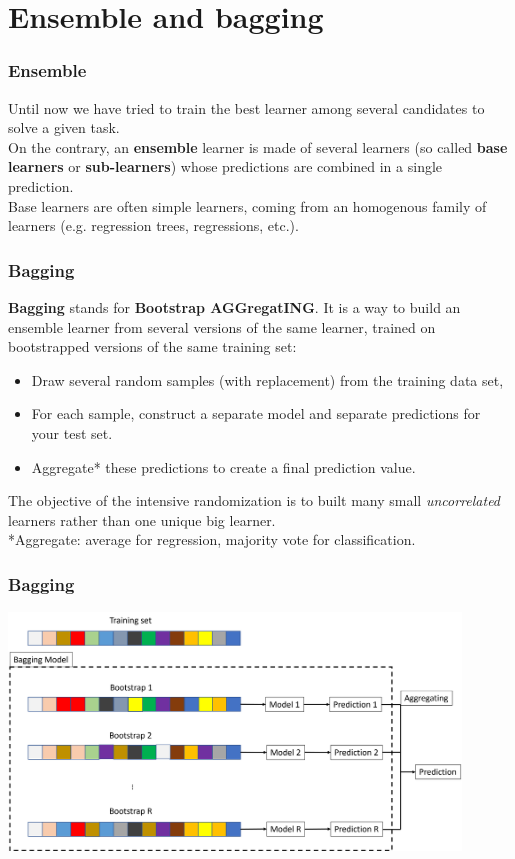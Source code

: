 \section{Ensemble and bagging}
\begin{frame}
\frametitle{Ensemble}
Until now we have tried to train the best learner among several candidates to solve a given task. \\
\vspace{0.2cm}
On the contrary, an {\bf ensemble} learner is made of several learners (so called {\bf base learners} or {\bf sub-learners}) whose predictions are combined in a single prediction. \\
\vspace{0.2cm}
Base learners are often simple learners, coming from an homogenous family of learners (e.g. regression trees, regressions, etc.). 
\end{frame}
\begin{frame}
\frametitle{Bagging}
{\bf Bagging} stands for {\bf Bootstrap AGGregatING}. It is a way to build an ensemble learner from several versions of the same learner, trained on bootstrapped versions of the same training set: 
\begin{itemize}
\item Draw several random samples (with replacement) from the training data set, 
\item For each sample, construct a separate model and separate predictions for your test set.
\item Aggregate* these predictions to create a final prediction value.
\end{itemize}
The objective of the intensive randomization is to built many small {\it uncorrelated} learners rather than one unique big learner.\\
\vspace{0.3cm}
*Aggregate: average for regression, majority vote for classification.
\end{frame}
\begin{frame}
\frametitle{Bagging}
\begin{center}
\includegraphics[width=12cm]{../Graphs/Bagging.png}
\end{center}
\end{frame}
